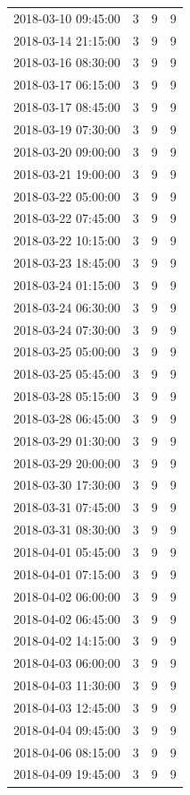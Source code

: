 \begin{tabular}{lrrr}
2018-03-10 09:45:00 & 3 & 9 & 9 \\
2018-03-14 21:15:00 & 3 & 9 & 9 \\
2018-03-16 08:30:00 & 3 & 9 & 9 \\
2018-03-17 06:15:00 & 3 & 9 & 9 \\
2018-03-17 08:45:00 & 3 & 9 & 9 \\
2018-03-19 07:30:00 & 3 & 9 & 9 \\
2018-03-20 09:00:00 & 3 & 9 & 9 \\
2018-03-21 19:00:00 & 3 & 9 & 9 \\
2018-03-22 05:00:00 & 3 & 9 & 9 \\
2018-03-22 07:45:00 & 3 & 9 & 9 \\
2018-03-22 10:15:00 & 3 & 9 & 9 \\
2018-03-23 18:45:00 & 3 & 9 & 9 \\
2018-03-24 01:15:00 & 3 & 9 & 9 \\
2018-03-24 06:30:00 & 3 & 9 & 9 \\
2018-03-24 07:30:00 & 3 & 9 & 9 \\
2018-03-25 05:00:00 & 3 & 9 & 9 \\
2018-03-25 05:45:00 & 3 & 9 & 9 \\
2018-03-28 05:15:00 & 3 & 9 & 9 \\
2018-03-28 06:45:00 & 3 & 9 & 9 \\
2018-03-29 01:30:00 & 3 & 9 & 9 \\
2018-03-29 20:00:00 & 3 & 9 & 9 \\
2018-03-30 17:30:00 & 3 & 9 & 9 \\
2018-03-31 07:45:00 & 3 & 9 & 9 \\
2018-03-31 08:30:00 & 3 & 9 & 9 \\
2018-04-01 05:45:00 & 3 & 9 & 9 \\
2018-04-01 07:15:00 & 3 & 9 & 9 \\
2018-04-02 06:00:00 & 3 & 9 & 9 \\
2018-04-02 06:45:00 & 3 & 9 & 9 \\
2018-04-02 14:15:00 & 3 & 9 & 9 \\
2018-04-03 06:00:00 & 3 & 9 & 9 \\
2018-04-03 11:30:00 & 3 & 9 & 9 \\
2018-04-03 12:45:00 & 3 & 9 & 9 \\
2018-04-04 09:45:00 & 3 & 9 & 9 \\
2018-04-06 08:15:00 & 3 & 9 & 9 \\
2018-04-09 19:45:00 & 3 & 9 & 9 \\

\end{tabular}

